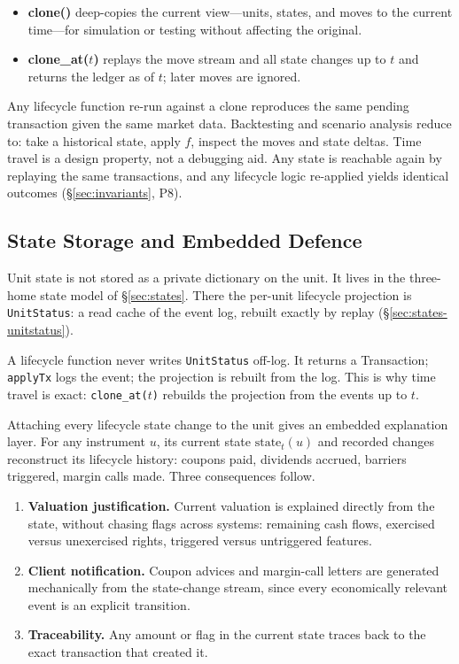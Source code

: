 \begin{itemize}[nosep]
\item \textbf{clone()} deep-copies the current view---units, states, and moves to the current time---for simulation or testing without affecting the original.
\item \textbf{clone\_at($t$)} replays the move stream and all state changes up to $t$ and returns the ledger as of $t$; later moves are ignored.
\end{itemize}

\noindent Any lifecycle function re-run against a clone reproduces the same pending transaction given the same market data. Backtesting and scenario analysis reduce to: take a historical state, apply $f$, inspect the moves and state deltas. Time travel is a design property, not a debugging aid. Any state is reachable again by replaying the same transactions, and any lifecycle logic re-applied yields identical outcomes (\S\ref{sec:invariants}, P8).

\subsection{State Storage and Embedded Defence}

Unit state is not stored as a private dictionary on the unit. It lives in the three-home state model of \S\ref{sec:states}. There the per-unit lifecycle projection is \texttt{UnitStatus}: a read cache of the event log, rebuilt exactly by replay (\S\ref{sec:states-unitstatus}).

\noindent A lifecycle function never writes \texttt{UnitStatus} off-log. It returns a Transaction; \texttt{applyTx} logs the event; the projection is rebuilt from the log. This is why time travel is exact: \texttt{clone\_at($t$)} rebuilds the projection from the events up to $t$.

Attaching every lifecycle state change to the unit gives an embedded explanation layer. For any instrument $u$, its current state $\text{state}_t(u)$ and recorded changes reconstruct its lifecycle history: coupons paid, dividends accrued, barriers triggered, margin calls made. Three consequences follow.

\begin{enumerate}[nosep]
\item \textbf{Valuation justification.} Current valuation is explained directly from the state, without chasing flags across systems: remaining cash flows, exercised versus unexercised rights, triggered versus untriggered features.
\item \textbf{Client notification.} Coupon advices and margin-call letters are generated mechanically from the state-change stream, since every economically relevant event is an explicit transition.
\item \textbf{Traceability.} Any amount or flag in the current state traces back to the exact transaction that created it.
\end{enumerate}

